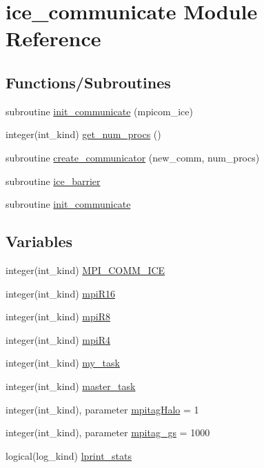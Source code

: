 \hypertarget{namespaceice__communicate}{
\section{ice\_\-communicate Module Reference}
\label{namespaceice__communicate}
}
\subsection*{Functions/Subroutines}
\begin{DoxyCompactItemize}
\item 
subroutine \hyperlink{namespaceice__communicate_a6588d53d155102d6df70bc1b3ad32b0b}{init\_\-communicate} (mpicom\_\-ice)
\item 
integer(int\_\-kind) \hyperlink{namespaceice__communicate_a770f142bf42a8d6877c33aa88ee083a8}{get\_\-num\_\-procs} ()
\item 
subroutine \hyperlink{namespaceice__communicate_ad2adaa21b7db32dd0153db9ab8053403}{create\_\-communicator} (new\_\-comm, num\_\-procs)
\item 
subroutine \hyperlink{namespaceice__communicate_adcaef4ea8733bb0217c377f794b1fd4c}{ice\_\-barrier}
\item 
subroutine \hyperlink{namespaceice__communicate_adbf0aa130556f1968ab2b21de96d9ac1}{init\_\-communicate}
\end{DoxyCompactItemize}
\subsection*{Variables}
\begin{DoxyCompactItemize}
\item 
integer(int\_\-kind) \hyperlink{namespaceice__communicate_ad2224da9473c4376695684ddb19ec66f}{MPI\_\-COMM\_\-ICE}
\item 
integer(int\_\-kind) \hyperlink{namespaceice__communicate_a817450a2b9532a4c7acb648ef5c1a8a4}{mpiR16}
\item 
integer(int\_\-kind) \hyperlink{namespaceice__communicate_a935c7b05783b45e8b2465e9e671290f8}{mpiR8}
\item 
integer(int\_\-kind) \hyperlink{namespaceice__communicate_a0f8744049bd83997c68c5181972a7930}{mpiR4}
\item 
integer(int\_\-kind) \hyperlink{namespaceice__communicate_a70e729e746e2e5ec592ccba505136002}{my\_\-task}
\item 
integer(int\_\-kind) \hyperlink{namespaceice__communicate_a769a45947743f12c592e4cef37a18b6c}{master\_\-task}
\item 
integer(int\_\-kind), parameter \hyperlink{namespaceice__communicate_abf79852ee48a5d30f16dffad09f5b9e1}{mpitagHalo} = 1
\item 
integer(int\_\-kind), parameter \hyperlink{namespaceice__communicate_a33a81d2a5d816dcfde8d2232e1f1b80e}{mpitag\_\-gs} = 1000
\item 
logical(log\_\-kind) \hyperlink{namespaceice__communicate_a6dd078fb822abac232bfb22bab20ec64}{lprint\_\-stats}
\end{DoxyCompactItemize}


